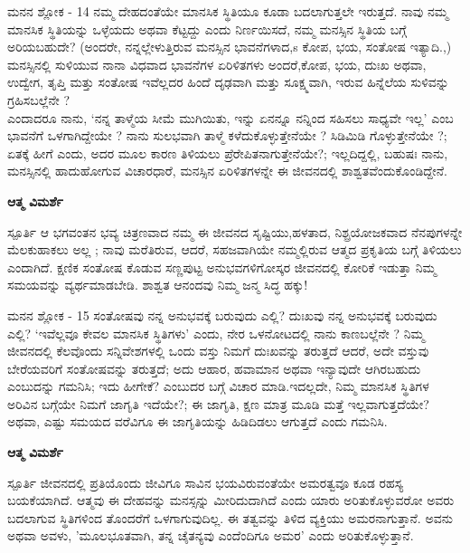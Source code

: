 \begin{mananam}{\mananamfont ಮನನ ಶ್ಲೋಕ - \textenglish{14}}
\footnotesize \mananamtext ನಮ್ಮ ದೇಹದಂತೆಯೇ ಮಾನಸಿಕ ಸ್ಥಿತಿಯೂ ಕೂಡಾ ಬದಲಾಗುತ್ತಲೇ ಇರುತ್ತದೆ. ನಾವು ನಮ್ಮ ಮಾನಸಿಕ ಸ್ಥಿತಿಯನ್ನು ಒಳ್ಳೆಯದು ಅಥವಾ ಕೆಟ್ಟದ್ದು ಎಂದು ನಿರ್ಣಯಿಸದೆ, ನಮ್ಮ ಮನಸ್ಸಿನ ಸ್ಥಿತಿಯ ಬಗ್ಗೆ ಅರಿಯಬಹುದೇ? (ಅಂದರೇ, ನನ್ನಲ್ಲೇಳುತ್ತಿರುವ ಮನಸ್ಸಿನ ಭಾವನೆಗಳಾದ,s ಕೋಪ,  ಭಯ, ಸಂತೋಷ ಇತ್ಯಾದಿ.,) ಮನಸ್ಸಿನಲ್ಲಿ ಸುಳಿಯುವ ನಾನಾ ವಿಧವಾದ ಭಾವನೆಗಳ ಏರಿಳಿತಗಳು ಅಂದರೆ,ಕೋಪ, ಭಯ, ದುಃಖ ಅಥವಾ, ಉದ್ವೇಗ, ತೃಪ್ತಿ ಮತ್ತು ಸಂತೋಷ ಇವೆಲ್ಲದರ ಹಿಂದೆ ದೃಢವಾಗಿ ಮತ್ತು ಸೂಕ್ಷ್ಮವಾಗಿ, ಇರುವ ಹಿನ್ನೆಲೆಯ ಸುಳಿವನ್ನು ಗ್ರಹಿಸಬಲ್ಲೆನೇ ?\\
ಎಂದಾದರೂ ನಾನು, ‘ನನ್ನ ತಾಳ್ಮೆಯ ಸೀಮೆ ಮುಗಿಯಿತು, ಇನ್ನು ಏನನ್ನೂ ನನ್ನಿಂದ ಸಹಿಸಲು ಸಾಧ್ಯವೇ ಇಲ್ಲ’ ಎಂಬ ಭಾವನೆಗೆ ಒಳಗಾಗಿದ್ದೇಯೇ ? ನಾನು ಸುಲಭವಾಗಿ ತಾಳ್ಮೆ ಕಳೆದುಕೊಳ್ಳುತ್ತೇನೆಯೇ ? ಸಿಡಿಮಿಡಿ ಗೊಳ್ಳುತ್ತೇನೆಯೇ ?; ಏತಕ್ಕೆ ಹೀಗೆ ಎಂದು, ಅದರ ಮೂಲ ಕಾರಣ ತಿಳಿಯಲು ಪ್ರೆರೇಪಿತನಾಗುತ್ತೇನೆಯೇ?; ಇಲ್ಲದಿದ್ದಲ್ಲಿ,  ಬಹುಷಃ ನಾನು,  ಮನಸ್ಸಿನಲ್ಲಿ ಹಾದುಹೋಗುವ ವಿಚಾರಧಾರೆ, ಮನಸ್ಸಿನ ಏರಿಳಿತಗಳನ್ನೇ ಈ ಜೀವನದಲ್ಲಿ ಶಾಶ್ವತವೆಂದುಕೊಂಡಿದ್ದೇನೆ. 
\end{mananam}
\WritingHand\enspace\textbf{ಆತ್ಮ ವಿಮರ್ಶೆ}
\begin{inspiration}{\mananamfont ಸ್ಪೂರ್ತಿ}
\footnotesize \mananamtext ಆ ಭಗವಂತನ ಭವ್ಯ ಚಿತ್ರಣವಾದ ನಮ್ಮ ಈ ಜೀವನದ ಸೃಷ್ಟಿಯು,ಹಳತಾದ, ನಿಶ್ಪ್ರಯೋಜಕವಾದ ನೆನಪುಗಳನ್ನೇ ಮೆಲಕುಹಾಕಲು ಅಲ್ಲ ; ನಾವು ಮರೆತಿರುವ, ಆದರೆ, ಸಹಜವಾಗಿಯೇ ನಮ್ಮಲ್ಲಿರುವ ಆತ್ಮದ ಪ್ರಕೃತಿಯ ಬಗ್ಗೆ ತಿಳಿಯಲು ಎಂದಾಗಿದೆ. ಕ್ಷಣಿಕ ಸಂತೋಷ ಕೊಡುವ ಸಣ್ಣಪುಟ್ಟ ಅನುಭವಗಳಿಗೋಸ್ಕರ ಜೀವನದಲ್ಲಿ ಕೋರಿಕೆ ಇಡುತ್ತಾ ನಿಮ್ಮ ಸಮಯವನ್ನು ವ್ಯರ್ಥಮಾಡಬೇಡಿ.  ಶಾಶ್ವತ ಆನಂದವು ನಿಮ್ಮ ಜನ್ಮ ಸಿದ್ಧ ಹಕ್ಕು!
\end{inspiration}
\newpage

\begin{mananam}{\mananamfont ಮನನ ಶ್ಲೋಕ - \textenglish{15}}
\footnotesize \mananamtext ಸಂತೋಷವು ನನ್ನ ಅನುಭವಕ್ಕೆ ಬರುವುದು ಎಲ್ಲಿ?  ದುಃಖವು ನನ್ನ ಅನುಭವಕ್ಕೆ ಬರುವುದು ಎಲ್ಲಿ? ‘ಇವೆಲ್ಲವೂ ಕೇವಲ ಮಾನಸಿಕ ಸ್ಥಿತಿಗಳು’ ಎಂದು, ನೇರ ಒಳನೋಟದಲ್ಲಿ ನಾನು ಕಾಣಬಲ್ಲೆನೇ ? ನಿಮ್ಮ ಜೀವನದಲ್ಲಿ ಕೆಲವೊಂದು ಸನ್ನಿವೇಶಗಳಲ್ಲಿ ಒಂದು ವಸ್ತು ನಿಮಗೆ ದುಃಖವನ್ನು ತರುತ್ತದೆ ಆದರೆ, ಅದೇ ವಸ್ತುವು ಬೇರೆಯವರಿಗೆ ಸಂತೋಷವನ್ನು ತರುತ್ತದೆ; ಅದು ಆಹಾರ, ಹವಾಮಾನ ಅಥವಾ ಇನ್ಯಾವುದೇ ಆಗಿರಬಹುದು ಎಂಬುದನ್ನು ಗಮನಿಸಿ; ಇದು ಹೀಗೇಕೆ? ಎಂಬುದರ ಬಗ್ಗೆ ವಿಚಾರ ಮಾಡಿ.ಇದಲ್ಲದೇ, ನಿಮ್ಮ ಮಾನಸಿಕ ಸ್ಥಿತಿಗಳ ಅರಿವಿನ ಬಗ್ಗೆಯೇ ನಿಮಗೆ ಜಾಗೃತಿ ಇದೆಯೇ?;  ಈ ಜಾಗೃತಿ, ಕ್ಷಣ ಮಾತ್ರ ಮೂಡಿ ಮತ್ತೆ ಇಲ್ಲವಾಗುತ್ತದೆಯೇ? ಅಥವಾ, ಎಷ್ಟು ಸಮಯದ ವರೆವಿಗೂ ಈ ಜಾಗೃತಿಯನ್ನು ಹಿಡಿದಿಡಲು ಆಗುತ್ತದೆ ಎಂದು ಗಮನಿಸಿ.
\end{mananam}
\WritingHand\enspace\textbf{ಆತ್ಮ ವಿಮರ್ಶೆ}
\begin{inspiration}{\mananamfont ಸ್ಪೂರ್ತಿ}
\footnotesize \mananamtext ಜೀವನದಲ್ಲಿ ಪ್ರತಿಯೊಂದು ಜೀವಿಗೂ ಸಾವಿನ ಭಯವಿರುವಂತೆಯೇ ಅಮರತ್ವವೂ ಕೂಡ ರಹಸ್ಯ ಬಯಕೆಯಾಗಿದೆ. ಆತ್ಮವು ಈ ದೇಹವನ್ನು ಮನಸ್ಸನ್ನು ಮೀರಿದುದಾಗಿದೆ ಎಂದು ಯಾರು ಅರಿತುಕೊಳ್ಳುವರೋ ಅವರು ಬದಲಾಗುವ ಸ್ಥಿತಿಗಳಿಂದ ತೊಂದರೆಗೆ ಒಳಗಾಗುವುದಿಲ್ಲ. ಈ ತತ್ವವನ್ನು ತಿಳಿದ ವ್ಯಕ್ತಿಯು ಅಮರನಾಗುತ್ತಾನೆ. ಅವನು ಅಥವಾ ಅವಳು, 'ಮೂಲಭೂತವಾಗಿ, ತನ್ನ ಚೈತನ್ಯವು ಎಂದೆಂದಿಗೂ ಅಮರ' ಎಂದು ಅರಿತುಕೊಳ್ಳುತ್ತಾನೆ.
\end{inspiration}

